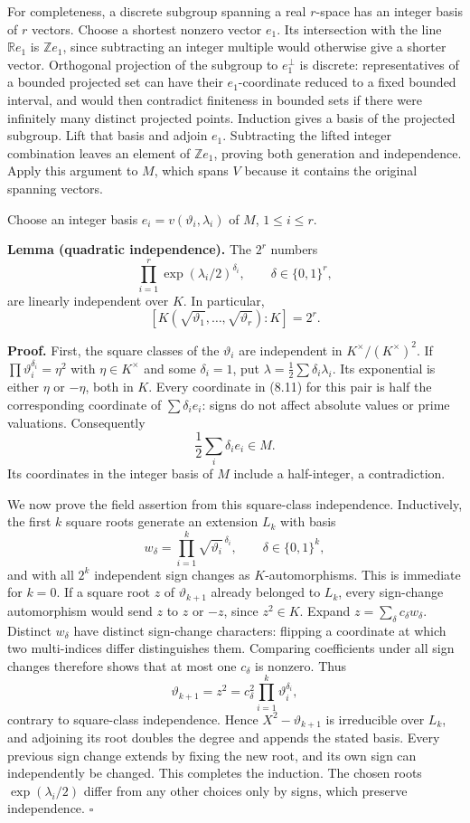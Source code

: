 \documentclass[
  11pt,
  a4paper,
]{article}
\begin{document}
For completeness, a discrete subgroup spanning a real \(r\)-space has an
integer basis of \(r\) vectors. Choose a shortest nonzero vector
\(e_1\). Its intersection with the line \(\mathbb R e_1\) is
\(\mathbb Z e_1\), since subtracting an integer multiple would otherwise
give a shorter vector. Orthogonal projection of the subgroup to
\(e_1^\perp\) is discrete: representatives of a bounded projected set
can have their \(e_1\)-coordinate reduced to a fixed bounded interval,
and would then contradict finiteness in bounded sets if there were
infinitely many distinct projected points. Induction gives a basis of
the projected subgroup. Lift that basis and adjoin \(e_1\). Subtracting
the lifted integer combination leaves an element of \(\mathbb Z e_1\),
proving both generation and independence. Apply this argument to \(M\),
which spans \(V\) because it contains the original spanning vectors.

Choose an integer basis \(e_i=v(\vartheta_i,\lambda_i)\) of \(M\),
\(1\le i\le r\).

\textbf{Lemma (quadratic independence).} The \(2^r\) numbers \[
\prod_{i=1}^r \exp(\lambda_i/2)^{\delta_i},
\qquad \delta\in\{0,1\}^r,
\tag{8.12}
\] are linearly independent over \(K\). In particular, \[
[K(\sqrt{\vartheta_1},\ldots,\sqrt{\vartheta_r}):K]=2^r.
\tag{8.13}
\]

\textbf{Proof.} First, the square classes of the \(\vartheta_i\) are
independent in \(K^\times/(K^\times)^2\). If
\(\prod\vartheta_i^{\delta_i}=\eta^2\) with \(\eta\in K^\times\) and
some \(\delta_i=1\), put \(\lambda=\frac12\sum\delta_i\lambda_i\). Its
exponential is either \(\eta\) or \(-\eta\), both in \(K\). Every
coordinate in (8.11) for this pair is half the corresponding coordinate
of \(\sum\delta_i e_i\): signs do not affect absolute values or prime
valuations. Consequently \[
\frac12\sum_i\delta_i e_i\in M.
\] Its coordinates in the integer basis of \(M\) include a half-integer,
a contradiction.

We now prove the field assertion from this square-class independence.
Inductively, the first \(k\) square roots generate an extension \(L_k\)
with basis \[
w_\delta=\prod_{i=1}^k\sqrt{\vartheta_i}^{\,\delta_i},
\qquad \delta\in\{0,1\}^k,
\] and with all \(2^k\) independent sign changes as \(K\)-automorphisms.
This is immediate for \(k=0\). If a square root \(z\) of
\(\vartheta_{k+1}\) already belonged to \(L_k\), every sign-change
automorphism would send \(z\) to \(z\) or \(-z\), since \(z^2\in K\).
Expand \(z=\sum_\delta c_\delta w_\delta\). Distinct \(w_\delta\) have
distinct sign-change characters: flipping a coordinate at which two
multi-indices differ distinguishes them. Comparing coefficients under
all sign changes therefore shows that at most one \(c_\delta\) is
nonzero. Thus \[
\vartheta_{k+1}=z^2=c_\delta^2\prod_{i=1}^k\vartheta_i^{\delta_i},
\] contrary to square-class independence. Hence \(X^2-\vartheta_{k+1}\)
is irreducible over \(L_k\), and adjoining its root doubles the degree
and appends the stated basis. Every previous sign change extends by
fixing the new root, and its own sign can independently be changed. This
completes the induction. The chosen roots \(\exp(\lambda_i/2)\) differ
from any other choices only by signs, which preserve independence.
\(\square\)
\end{document}
